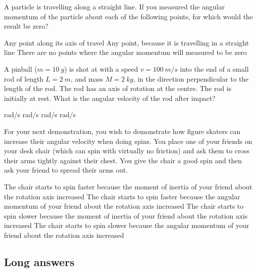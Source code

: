 \question A particle is travelling along a straight line. If you measured the angular momentum of the particle about each of the following points, for which would the result be zero?
\begin{checkboxes}
\CorrectChoice Any point along its axis of travel \correct
\choice Any point, because it is travelling in a straight line
\choice There are no points where the angular momentum will measured to be zero
\end{checkboxes}

\question  A pinball ($m=\SI{10}{g}$) is shot at with a speed $v=\SI{100}{m/s}$ into the end of a small rod of length $L=\SI{2}{m}$, and mass $M=\SI{2}{kg}$, in the direction perpendicular to the length of the rod.  The rod has an axis of rotation at the centre.  The rod is initially at rest.  What is the angular velocity of the rod after impact?
\begin{checkboxes}
 rad/s
 rad/s \correct
{} rad/s
 rad/s
\end{checkboxes}

\question[1] For your next demonstration, you wish to demonstrate how figure skaters can increase their angular velocity when doing spins. You place one of your friends on your desk chair (which can spin with virtually no friction) and ask them to cross their arms tightly against their chest. You give the chair a good spin and then ask your friend to spread their arms out. 
\begin{checkboxes} 
\choice The chair starts to spin faster because the moment of inertia of your friend about the rotation axis increased
\choice The chair starts to spin faster because the angular momentum of your friend about the rotation axis increased
\CorrectChoice The chair starts to spin slower because the moment of inertia of your friend about the rotation axis increased \correct
\choice The chair starts to spin slower because the angular momentum of your friend about the rotation axis increased
\end{checkboxes}


%
%
\subsection{Long answers}

